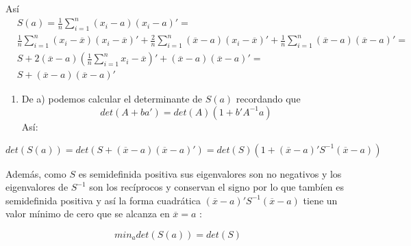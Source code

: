 \documentclass[
]{article}
\providecommand{\tightlist}{%
  \setlength{\itemsep}{0pt}\setlength{\parskip}{0pt}}
\begin{document}
Así \begin{align*}
&S(a) = \frac{1}{n}\sum_{i=1}^{n} (x_{i}-a)(x_{i}-a)' =\\
&\frac{1}{n}\sum_{i=1}^{n}(x_{i}-\overline{x})(x_{i}-\overline{x})'+ \frac{2}{n}\sum_{i=1}^{n}(\overline{x}-a)(x_{i}-\overline{x})'+ \frac{1}{n}\sum_{i=1}^{n}(\overline{x}-a)(\overline{x}-a)' = \\
&S + 2(\overline{x}-a)(\frac{1}{n}\sum_{i=1}^{n}x_{i}-\overline{x})'+(\overline{x}-a)(\overline{x}-a)' = \\
&S + (\overline{x}-a)(\overline{x}-a)'
\end{align*}

\begin{enumerate}
\def\labelenumi{\alph{enumi})}
\setcounter{enumi}{1}
\tightlist
\item
  De a) podemos calcular el determinante de \(S(a)\) recordando que
  \[det(A+ba') = det(A)(1+b'A^{-1}a)\] Así:
\end{enumerate}

\[det(S(a)) = det(S+(\overline{x}-a)(\overline{x}-a)') = det(S)(1+(\overline{x}-a)'S^{-1}(\overline{x}-a))\]

Además, como \(S\) es semidefinida positiva sus eigenvalores son no
negativos y los eigenvalores de \(S^{-1}\) son los recíprocos y
conservan el signo por lo que tambíen es semidefinida positiva y así la
forma cuadrática \((\overline{x}-a)'S^{-1}(\overline{x}-a)\) tiene un
valor mínimo de cero que se alcanza en \(\overline{x} = a\) :

\[min_{a}det(S(a)) = det(S)\]
\end{document}
